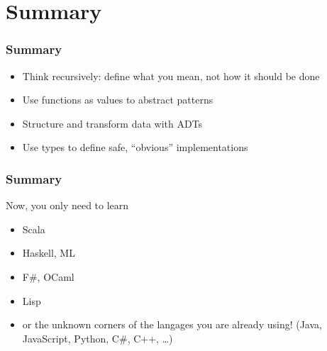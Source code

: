 \documentclass{beamer}
\begin{document}
\section{Summary}

\begin{frame}[containsverbatim]
  \frametitle{Summary} 

  \begin{itemize}
  \item Think recursively: define what you mean, not how it should be done
  \item Use functions as values to abstract patterns
  \item Structure and transform data with ADTs
  \item Use types to define safe, \enquote{obvious} implementations
  \end{itemize}
\end{frame}

\begin{frame}[containsverbatim]
  \frametitle{Summary} 

  Now, you only need to learn

  \begin{itemize}
  \item Scala
  \item Haskell, ML
  \item F\#, OCaml
  \item Lisp
  \item or the unknown corners of the langages you are already using! (Java, JavaScript, Python,
    C\#, C++, \ldots)
  \end{itemize}
\end{frame}
\end{document}
